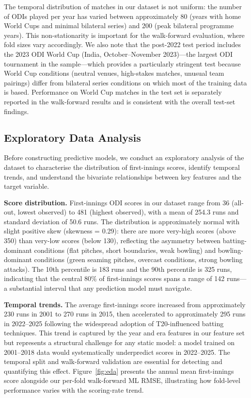 \documentclass[10pt,a4paper,twocolumn]{article}
\begin{document}
The temporal distribution of matches in our dataset is not uniform: the number of ODIs played per year has varied between approximately 80 (years with home World Cups and minimal bilateral series) and 200 (peak bilateral programme years). This non-stationarity is important for the walk-forward evaluation, where fold sizes vary accordingly. We also note that the post-2022 test period includes the 2023 ODI World Cup (India, October--November 2023)---the largest ODI tournament in the sample---which provides a particularly stringent test because World Cup conditions (neutral venues, high-stakes matches, unusual team pairings) differ from bilateral series conditions on which most of the training data is based. Performance on World Cup matches in the test set is separately reported in the walk-forward results and is consistent with the overall test-set findings.

\subsection{Exploratory Data Analysis}
\label{sec:eda}

Before constructing predictive models, we conduct an exploratory analysis of the dataset to characterise the distribution of first-innings scores, identify temporal trends, and understand the bivariate relationships between key features and the target variable.

\textbf{Score distribution.} First-innings ODI scores in our dataset range from 36 (all-out, lowest observed) to 481 (highest observed), with a mean of 254.3 runs and standard deviation of 50.6 runs. The distribution is approximately normal with slight positive skew (skewness = 0.29): there are more very-high scores (above 350) than very-low scores (below 130), reflecting the asymmetry between batting-dominant conditions (flat pitches, short boundaries, weak bowling) and bowling-dominant conditions (green seaming pitches, overcast conditions, strong bowling attacks). The 10th percentile is 183 runs and the 90th percentile is 325 runs, indicating that the central 80\% of first-innings scores spans a range of 142 runs---a substantial interval that any prediction model must navigate.

\textbf{Temporal trends.} The average first-innings score increased from approximately 230 runs in 2001 to 270 runs in 2015, then accelerated to approximately 295 runs in 2022--2025 following the widespread adoption of T20-influenced batting techniques. This trend is captured by the year and era features in our feature set but represents a structural challenge for any static model: a model trained on 2001--2018 data would systematically underpredict scores in 2022--2025. The temporal split and walk-forward validation are essential for detecting and quantifying this effect. Figure~\ref{fig:eda} presents the annual mean first-innings score alongside our per-fold walk-forward ML RMSE, illustrating how fold-level performance varies with the scoring-rate trend.
\end{document}

